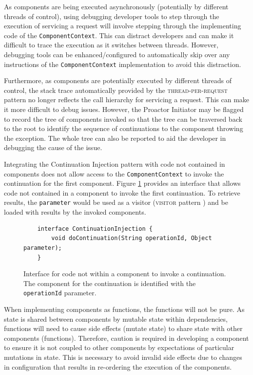 \documentclass[prodmode]{style/acmlarge}
\begin{document}
As components are being executed asynchronously (potentially by different
threads of control), using debugging developer tools to step through the
execution of servicing a request will involve stepping through the implementing
code of the \texttt{ComponentContext}.  This can distract developers and can
make it difficult to trace the execution as it switches between threads. 
However, debugging tools can be enhanced/configured to automatically skip over any
instructions of the \texttt{ComponentContext} implementation to avoid this
distraction.

Furthermore, as components are potentially executed by different threads of
control, the stack trace automatically provided by the
\textsc{thread-per-request} pattern no longer reflects the call hierarchy for
servicing a request.  This can make it more difficult to debug issues.  However,
the Proactor Initiator may be flagged to record the tree of components invoked
so that the tree can be traversed back to the root to identify the sequence of
continuations to the component throwing the exception.  The whole tree can also
be reported to aid the developer in debugging the cause of the issue.

Integrating the Continuation Injection pattern with code not contained in
components does not allow access to the \texttt{ComponentContext} to invoke the
continuation for the first component.  Figure
\ref{fig:ContinuationInjectionInterface} provides an interface that allows code
not contained in a component to invoke the first continuation.  To retrieve
results, the \texttt{parameter} would be used as a visitor (\textsc{visitor}
pattern \cite{gof}) and be loaded with results by the invoked components.

\begin{figure}[tp]
\begin{verbatim}
    interface ContinuationInjection {
        void doContinuation(String operationId, Object parameter);
    }
\end{verbatim}
\caption{Interface for code not within a component to invoke a continuation.  The component for the continuation is identified with the \texttt{operationId} parameter.}
\label{fig:ContinuationInjectionInterface}
\end{figure}

When implementing components as functions, the functions will not be pure.  As
state is shared between components by mutable state within dependencies,
functions will need to cause side effects (mutate state) to share state with
other components (functions).  Therefore, caution is required in developing a
component to ensure it is not coupled to other components by expectations of
particular mutations in state.  This is necessary to avoid invalid side effects
due to changes in configuration that results in re-ordering the execution of the
components.
\end{document}
